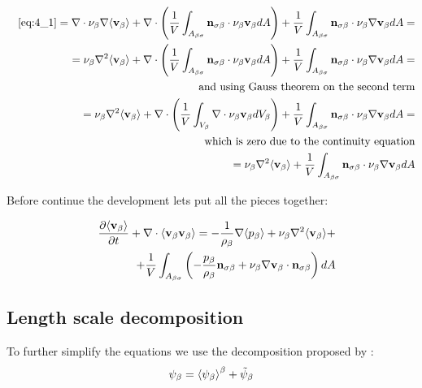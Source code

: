 \begin{eqnarray}
	&&\eqref{eq:4_1} = \nabla \cdot \nu_{\beta} \nabla {\left< \textbf{v}_{\beta}\right>} + \nabla \cdot \left( \dfrac{1}{V} \int_{A_{\beta \sigma}} \mathbf{n}_{\sigma \beta} \cdot \nu_{\beta} \textbf{v}_{\beta} dA \right) + \dfrac{1}{V} \int_{A_{\beta \sigma}} \mathbf{n}_{\sigma \beta} \cdot \nu_{\beta} \nabla \textbf{v}_{\beta} dA = \nonumber \\
	&& = \nu_{\beta}\nabla^2 {\left< \textbf{v}_{\beta} \right>} +  \nabla \cdot \left( \dfrac{1}{V} \int_{A_{\beta \sigma}} \mathbf{n}_{\sigma \beta} \cdot \nu_{\beta} \textbf{v}_{\beta} dA \right) + \dfrac{1}{V} \int_{A_{\beta \sigma}} \mathbf{n}_{\sigma \beta} \cdot \nu_{\beta} \nabla \textbf{v}_{\beta} dA  = \nonumber \\
	&& \text{and using Gauss theorem on the second term} \nonumber \\
	&& = \nu_{\beta}\nabla^2 {\left< \textbf{v}_{\beta} \right>} +  \nabla \cdot \left( \dfrac{1}{V} \int_{V_\beta} \nabla \cdot \nu_{\beta} \textbf{v}_{\beta} dV_\beta \right) + \dfrac{1}{V} \int_{A_{\beta \sigma}} \mathbf{n}_{\sigma \beta} \cdot \nu_{\beta} \nabla \textbf{v}_{\beta} dA = \nonumber \\
	&& \text{which is zero due to the continuity equation} \nonumber \\
	&& = \nu_{\beta}\nabla^2 {\left< \textbf{v}_{\beta} \right>} + \dfrac{1}{V} \int_{A_{\beta \sigma}} \mathbf{n}_{\sigma \beta} \cdot \nu_{\beta} \nabla \textbf{v}_{\beta} dA
\end{eqnarray}


Before continue the development lets put all the pieces together:

\begin{eqnarray}
&& \frac{\partial {\left< \textbf{v}_{\beta}\right>}}{\partial t} + \nabla \cdot {\left< \textbf{v}_{\beta}\textbf{v}_{\beta}\right>} = -\dfrac{1}{\rho_{\beta}} \nabla {\left< p_{\beta}\right>} + \nu_{\beta}\nabla^2 {\left< \textbf{v}_{\beta} \right>} + \nonumber \\
&& +\dfrac{1}{V} \int_{A_{\beta \sigma}} \left( -\dfrac{p_{\beta}}{\rho_{\beta}} \mathbf{n}_{\sigma \beta} + \nu_{\beta} \nabla \textbf{v}_{\beta} \cdot \mathbf{n}_{\sigma \beta} \right) dA
	\label{eq:vans_2}
\end{eqnarray}


\subsection{Length scale decomposition}

To further simplify the equations we use the decomposition proposed by \citet{gray1975derivation}:
\begin{equation}
\psi_{\beta} = {\left< \psi_{\beta} \right>}^{\beta} + \tilde{\psi}_{\beta}
\end{equation}

